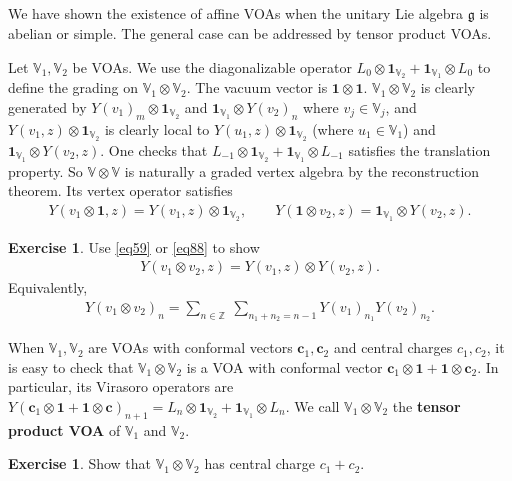 \documentclass[11pt,b5paper,notitlepage]{article}
\theoremstyle{definition}
\newtheorem{exe}[df]{Exercise}
\theoremstyle{plain}
\newcommand{\id}{\mathbf{1}}
\newcommand{\gk}{\mathfrak g}
\newcommand{\Vbb}{\mathbb V}
\newcommand{\Zbb}{\mathbb Z}
\newcommand{\cbf}{\mathbf c}
\numberwithin{equation}{section}
\begin{document}
\subsection{}\label{lb58}

We have shown the existence of affine VOAs when the unitary Lie algebra $\gk$ is abelian or simple. The general case can be addressed by  tensor product VOAs.

Let $\Vbb_1,\Vbb_2$ be VOAs. We use the diagonalizable operator $L_0\otimes\id_{\Vbb_2}+\id_{\Vbb_1}\otimes L_0$ to define the grading on $\Vbb_1\otimes\Vbb_2$. The vacuum vector is $\id\otimes\id$. $\Vbb_1\otimes\Vbb_2$ is clearly generated by $Y(v_1)_m\otimes\id_{\Vbb_2}$ and $\id_{\Vbb_1}\otimes Y(v_2)_n$ where $v_j\in\Vbb_j$, and $Y(v_1,z)\otimes\id_{\Vbb_2}$ is clearly local to  $Y(u_1,z)\otimes\id_{\Vbb_2}$ (where $u_1\in\Vbb_1$) and $\id_{\Vbb_1}\otimes Y(v_2,z)$. One checks that $L_{-1}\otimes\id_{\Vbb_2}+\id_{\Vbb_1}\otimes L_{-1}$ satisfies the translation property. So $\Vbb\otimes\Vbb$ is naturally a graded vertex algebra by the reconstruction theorem. Its vertex operator satisfies
\begin{align}
Y(v_1\otimes\id,z)=Y(v_1,z)\otimes\id_{\Vbb_2},\qquad Y(\id\otimes v_2,z)=\id_{\Vbb_1}\otimes Y(v_2,z).
\end{align}


\begin{exe}
Use \eqref{eq59} or \eqref{eq88} to show
\begin{align}
Y(v_1\otimes v_2,z)=Y(v_1,z)\otimes Y(v_2,z).
\end{align}
Equivalently,
\begin{align}
Y(v_1\otimes v_2)_n=\sum_{n\in\Zbb}~ \sum_{n_1+n_2=n-1}Y(v_1)_{n_1}Y(v_2)_{n_2}.	
\end{align}
\end{exe}
 
When $\Vbb_1,\Vbb_2$ are VOAs with conformal vectors $\cbf_1,\cbf_2$ and central charges $c_1,c_2$, it is easy to check that $\Vbb_1\otimes\Vbb_2$ is a VOA with conformal vector $\cbf_1\otimes\id+\id\otimes\cbf_2$. In particular, its Virasoro operators are $Y(\cbf_1\otimes\id+\id\otimes\cbf)_{n+1}=L_n\otimes\id_{\Vbb_2}+\id_{\Vbb_1}\otimes L_n$. We call $\Vbb_1\otimes\Vbb_2$ the \textbf{tensor product VOA} of $\Vbb_1$ and $\Vbb_2$.

\begin{exe}
Show that $\Vbb_1\otimes\Vbb_2$ has central charge $c_1+c_2$.
\end{exe}
\end{document}
